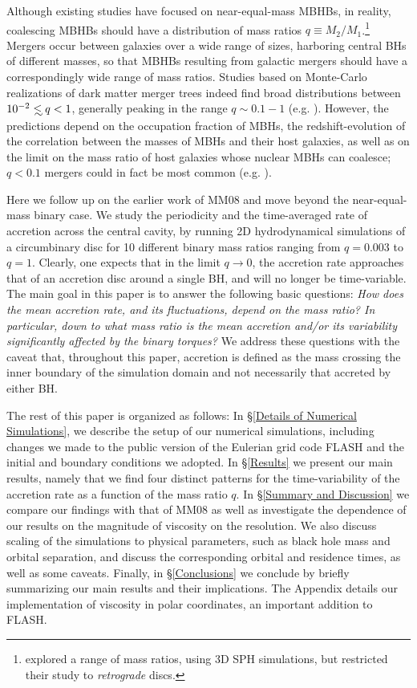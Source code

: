 Although existing studies have focused on near-equal-mass MBHBs, in
reality, coalescing MBHBs should have a distribution of mass ratios
$q\equiv M_2/M_1$.\footnote{\citet{Nixon:2011:LongSim} explored a
  range of mass ratios, using 3D SPH simulations, but restricted their
  study to {\em retrograde} discs.}  Mergers occur between galaxies
over a wide range of sizes, harboring central BHs of different masses,
so that MBHBs resulting from galactic mergers should have a
correspondingly wide range of mass ratios.  Studies based on
Monte-Carlo realizations of dark matter merger trees indeed find broad
distributions between $10^{-2}\lsim q < 1$, generally peaking in the
range $q\sim 0.1-1$
(e.g. \citealt{Volonteri+2003,Sesana+2005,Sesana+2012,GergelyBiermann:2012}).
However, the predictions depend on the occupation fraction of MBHs,
the redshift-evolution of the correlation between the masses of MBHs
and their host galaxies, as well as on the limit on the mass ratio of
host galaxies whose nuclear MBHs can coalesce; $q<0.1$ mergers could
in fact be most common (e.g. \citealt{Lippai+2009}).

Here we follow up on the earlier work of MM08 and move beyond the
near-equal-mass binary case. We study the periodicity and the
time-averaged rate of accretion across the central cavity, by running
2D hydrodynamical simulations of a circumbinary disc for 10 different
binary mass ratios ranging from $q=0.003$ to $q=1$.  Clearly, one
expects that in the limit $q\rightarrow 0$, the accretion rate
approaches that of an accretion disc around a single BH, and will no
longer be time-variable.  The main goal in this paper is to answer the
following basic questions: {\em How does the mean accretion rate, and
  its fluctuations, depend on the mass ratio?  In particular, down to
  what mass ratio is the mean accretion and/or its variability
  significantly affected by the binary torques?} 
We address these questions with the caveat that, throughout this paper, accretion is defined as the mass 
crossing the inner boundary of the simulation domain and not necessarily 
that accreted by either BH.


The rest of this paper is organized as follows:
%
In \S \ref{Details of Numerical Simulations}, we describe the setup of
our numerical simulations, including changes we made to the
public version of the Eulerian grid code FLASH and the initial and boundary conditions we adopted.
%
In \S \ref{Results} we present our main results, namely that  
we find four distinct patterns for the time-variability of the
accretion rate as a function of the mass ratio $q$.  
%
In \S \ref{Summary and Discussion} we compare our findings with 
that of MM08 as well as investigate the dependence of our results 
on the magnitude of viscosity on the resolution. We also
discuss scaling of the simulations to
physical parameters, such as black hole mass and orbital separation,
and discuss the corresponding orbital and residence times,
as well as some caveats.
%
Finally, in \S \ref{Conclusions} we conclude by briefly summarizing our
main results and their implications.
%
The Appendix details our implementation of viscosity in polar coordinates, an important addition to FLASH.



